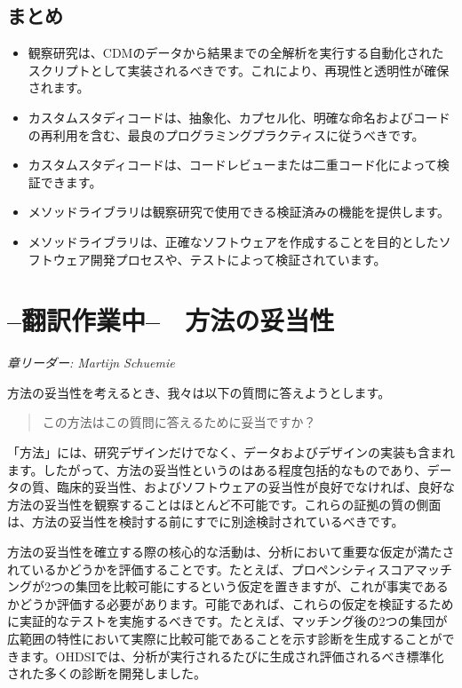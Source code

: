 \documentclass[
  11pt]{book}
\makeatletter
\newenvironment{kframe}{%
\medskip{}
\setlength{\fboxsep}{.8em}
 \def\at@end@of@kframe{}%
 \ifinner\ifhmode%
  \def\at@end@of@kframe{\end{minipage}}%
  \begin{minipage}{\columnwidth}%
 \fi\fi%
 \def\FrameCommand##1{\hskip\@totalleftmargin \hskip-\fboxsep
 \colorbox{myShadeColor}{##1}\hskip-\fboxsep
     \hskip-\linewidth \hskip-\@totalleftmargin \hskip\columnwidth}%
 \MakeFramed {\advance\hsize-\width
   \@totalleftmargin\z@ \linewidth\hsize
   \@setminipage}}%
 {\par\unskip\endMakeFramed%
 \at@end@of@kframe}
\newenvironment{rmdblock}[1]
  {
  \begin{itemize}
  \renewcommand{\labelitemi}{
    \raisebox{-.7\height}[0pt][0pt]{
      {\setkeys{Gin}{width=3em,keepaspectratio}\texttt{[image: images/\#1]}}
    }
  }
  \setlength{\fboxsep}{1em}
  \begin{kframe}
  \item
  }
  {
  \end{kframe}
  \end{itemize}
  }
\newenvironment{rmdsummary}
  {\begin{rmdblock}{summary}}
  {\end{rmdblock}}
\theoremstyle{definition}
\theoremstyle{definition}
\theoremstyle{definition}
\theoremstyle{definition}
\theoremstyle{remark}
\makeatother
\begin{document}
\section{まとめ}\label{ux307eux3068ux3081-12}

\begin{rmdsummary}
\begin{itemize}
\item
  観察研究は、CDMのデータから結果までの全解析を実行する自動化されたスクリプトとして実装されるべきです。これにより、再現性と透明性が確保されます。
\item
  カスタムスタディコードは、抽象化、カプセル化、明確な命名およびコードの再利用を含む、最良のプログラミングプラクティスに従うべきです。
\item
  カスタムスタディコードは、コードレビューまたは二重コード化によって検証できます。
\item
  メソッドライブラリは観察研究で使用できる検証済みの機能を提供します。
\item
  メソッドライブラリは、正確なソフトウェアを作成することを目的としたソフトウェア開発プロセスや、テストによって検証されています。
\end{itemize}
\end{rmdsummary}

\chapter{--翻訳作業中--　方法の妥当性}\label{MethodValidity}


\emph{章リーダー: Martijn Schuemie}

方法の妥当性を考えるとき、我々は以下の質問に答えようとします。

\begin{quote}
この方法はこの質問に答えるために妥当ですか？
\end{quote}

「方法」には、研究デザインだけでなく、データおよびデザインの実装も含まれます。したがって、方法の妥当性というのはある程度包括的なものであり、データの質、臨床的妥当性、およびソフトウェアの妥当性が良好でなければ、良好な方法の妥当性を観察することはほとんど不可能です。これらの証拠の質の側面は、方法の妥当性を検討する前にすでに別途検討されているべきです。

方法の妥当性を確立する際の核心的な活動は、分析において重要な仮定が満たされているかどうかを評価することです。たとえば、プロペンシティスコアマッチングが2つの集団を比較可能にするという仮定を置きますが、これが事実であるかどうか評価する必要があります。可能であれば、これらの仮定を検証するために実証的なテストを実施するべきです。たとえば、マッチング後の2つの集団が広範囲の特性において実際に比較可能であることを示す診断を生成することができます。OHDSIでは、分析が実行されるたびに生成され評価されるべき標準化された多くの診断を開発しました。
\end{document}
